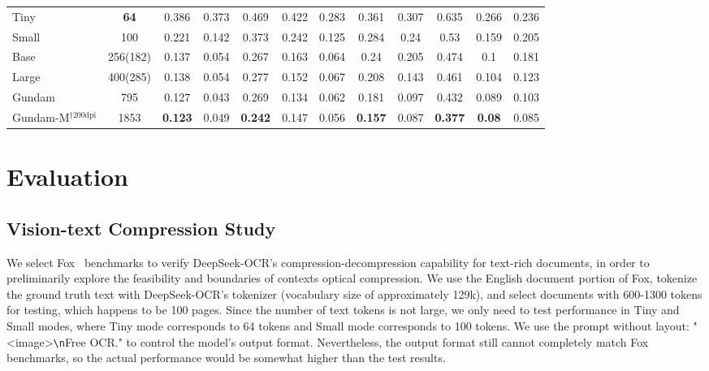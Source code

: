 \documentclass[11pt, a4paper, logo, copyright, nonumbering]{deepseek}
\begin{document}
\begin{CJK*}{UTF8}{gbsn}
\begin{table}[!t]
{\begin{tabular}{lccccccccccc}
            \midrule 
            \rowcolor{blue!4}
            \multicolumn{12}{c}{\textbf{DeepSeek-OCR (end2end)}} \\ 
            \midrule 
            Tiny& \bf{64} & 0.386 & 0.373 & 0.469 & 0.422 & 0.283 & 0.361 & 0.307 & 0.635 & 0.266 & 0.236 \\
            Small& 100 & 0.221 &0.142 & 0.373 & 0.242 & 0.125 & 0.284 & 0.24 & 0.53 & 0.159 & 0.205\\
            Base& 256(182) & 0.137 & 0.054 & 0.267 & 0.163 & 0.064 & 0.24 & 0.205 & 0.474 & 0.1 & 0.181 \\
            Large& 400(285) & 0.138 & 0.054 & 0.277 & 0.152 & 0.067 & 0.208 & 0.143 & 0.461 & 0.104 & 0.123 \\
            Gundam& 795 & 0.127 & 0.043 & 0.269 & 0.134 & 0.062 & 0.181 & 0.097 & 0.432 & 0.089 & 0.103 \\
            Gundam-M{\color{black}$^{\dagger{\mathrm{200dpi}}}$}& 1853 & \bf{0.123} & 0.049 & \bf{0.242} & 0.147 &0.056 & \bf{0.157} & 0.087& \bf{0.377} & \bf{0.08} & 0.085 \\
            

			\bottomrule		
	\end{tabular}}		

	\label{table3}
\end{table}


\section{Evaluation}

\subsection{Vision-text Compression Study}
\label{vision-text compression}
We select Fox~\cite{liu2024focus_fox} benchmarks to verify DeepSeek-OCR's compression-decompression capability for text-rich documents, in order to preliminarily explore the  feasibility and boundaries of contexts optical compression. We use the English document portion of Fox, tokenize the ground truth text with DeepSeek-OCR's tokenizer (vocabulary size of approximately 129k), and select documents with 600-1300 tokens for testing, which happens to be 100 pages. Since the number of text tokens is not large, we only need to test performance in Tiny and Small modes, where Tiny mode corresponds to 64 tokens and Small mode corresponds to 100 tokens. We use the prompt without layout: "<image>\verb|\n|Free OCR." to control the model's output format. Nevertheless, the output format still cannot completely match Fox benchmarks, so the actual performance would be somewhat higher than the test results.


\end{CJK*}
\end{document}

